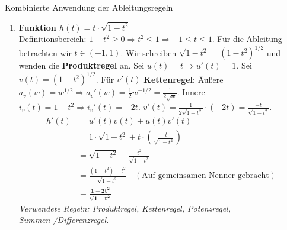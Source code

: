 \begin{loesungsumgebung}{Kombinierte Anwendung der Ableitungsregeln}
\begin{enumerate}[label=(\alph*)]
    \item \textbf{Funktion $h(t) = t \cdot \sqrt{1-t^2}$} \\
    Definitionsbereich: $1-t^2 \ge 0 \Rightarrow t^2 \le 1 \Rightarrow -1 \le t \le 1$. Für die Ableitung betrachten wir $t \in (-1,1)$.
    Wir schreiben $\sqrt{1-t^2} = (1-t^2)^{1/2}$ und wenden die \textbf{Produktregel} an.
    Sei $u(t) = t \Rightarrow u'(t) = 1$.
    Sei $v(t) = (1-t^2)^{1/2}$. Für $v'(t)$ \textbf{Kettenregel}:
    Äußere $a_v(w) = w^{1/2} \Rightarrow a_v'(w) = \frac{1}{2}w^{-1/2} = \frac{1}{2\sqrt{w}}$.
    Innere $i_v(t) = 1-t^2 \Rightarrow i_v'(t) = -2t$.
    $v'(t) = \frac{1}{2\sqrt{1-t^2}} \cdot (-2t) = \frac{-t}{\sqrt{1-t^2}}$.
    \begin{align*}
    h'(t) &= u'(t)v(t) + u(t)v'(t) \\
          &= 1 \cdot \sqrt{1-t^2} + t \cdot \left(\frac{-t}{\sqrt{1-t^2}}\right) \\
          &= \sqrt{1-t^2} - \frac{t^2}{\sqrt{1-t^2}} \\
          &= \frac{(1-t^2) - t^2}{\sqrt{1-t^2}} \quad (\text{Auf gemeinsamen Nenner gebracht}) \\
          &= \mathbf{\frac{1-2t^2}{\sqrt{1-t^2}}}
    \end{align*}
    \textit{Verwendete Regeln: Produktregel, Kettenregel, Potenzregel, Summen-/Differenzregel.}


\end{enumerate}
\end{loesungsumgebung}
